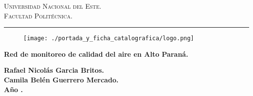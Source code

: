 \documentclass[12pt,a4paper,oneside]{book}
\begin{document}
\renewcommand{\glossaryname}{Glosario}

\renewcommand\listtablename{\'Indice de Tablas}

\renewcommand{\tablename}{Tabla}
\renewcommand{\acronymname}{Acr\'onimos y s\'imbolos}
\renewcommand{\bibname}{Referencias bibliogr\'aficas}
\frontmatter
\vspace*{-3cm}
\begin{figure}[h]
\leavevmode
\begin{minipage}{\textwidth}
\begin{center}
\end{center}
\end{minipage}
\end{figure}

\thispagestyle{empty}

{\bf
\begin{center}
\large
\vspace*{-1 cm}\Large \textsc{Universidad Nacional del Este.} \\
\Large \textsc{Facultad Politécnica.} \\
\vspace*{0.5 cm}\hrule
\end{center}
}

\vspace*{-0.5 cm}
\begin{figure}[htb]
\begin{center}
\texttt{[image: ./portada\_y\_ficha\_catalografica/logo.png]}

\end{center}
\end{figure}


\vspace{3 cm}
{
\noindent
\begin{center}
\huge \bf Red de monitoreo de calidad del aire en Alto Paraná.
\end{center}
}


\vspace{6 cm}

\begin{center}
{\textbf{\Large Rafael Nicolás Garcia Britos.}\\[5mm]
\textbf{\Large Camila Belén Guerrero Mercado.}\\[5mm]
\vspace{1 cm}
\textbf{Año \the\year.}}
\end{center}

\end{document}
